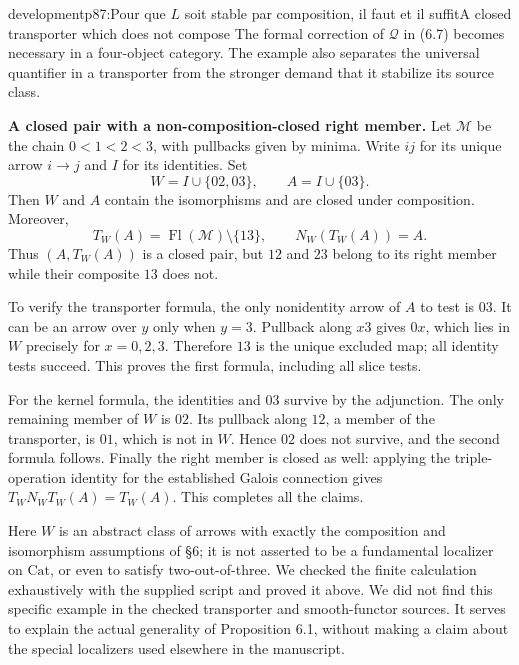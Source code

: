 \begin{dcomment}{development}{p87:Pour que $L$ soit stable par composition, il faut et il suffit}{A closed transporter which does not compose}
The formal correction of $\mathcal Q$ in (6.7) becomes necessary in a four-object category. The example also separates the universal quantifier in a transporter from the stronger demand that it stabilize its source class.

\textbf{A closed pair with a non-composition-closed right member.}\ours{}
Let $\mathcal M$ be the chain $0<1<2<3$, with pullbacks given by minima. Write $ij$ for its unique arrow $i\to j$ and $I$ for its identities. Set
\[
 W=I\cup\{02,03\},\qquad A=I\cup\{03\}.
\]
Then $W$ and $A$ contain the isomorphisms and are closed under composition. Moreover,
\[
 T_W(A)=\operatorname{Fl}(\mathcal M)\setminus\{13\},
 \qquad N_W(T_W(A))=A.
\]
Thus $(A,T_W(A))$ is a closed pair, but $12$ and $23$ belong to its right member while their composite $13$ does not.

To verify the transporter formula, the only nonidentity arrow of $A$ to test is $03$. It can be an arrow over $y$ only when $y=3$. Pullback along $x3$ gives $0x$, which lies in $W$ precisely for $x=0,2,3$. Therefore $13$ is the unique excluded map; all identity tests succeed. This proves the first formula, including all slice tests.

For the kernel formula, the identities and $03$ survive by the adjunction. The only remaining member of $W$ is $02$. Its pullback along $12$, a member of the transporter, is $01$, which is not in $W$. Hence $02$ does not survive, and the second formula follows. Finally the right member is closed as well: applying the triple-operation identity for the established Galois connection gives $T_WN_WT_W(A)=T_W(A)$. This completes all the claims.

Here $W$ is an abstract class of arrows with exactly the composition and isomorphism assumptions of \S6; it is not asserted to be a fundamental localizer on $\mathrm{Cat}$, or even to satisfy two-out-of-three. We checked the finite calculation exhaustively with the supplied script and proved it above. We did not find this specific example in the checked transporter and smooth-functor sources. It serves to explain the actual generality of Proposition 6.1, without making a claim about the special localizers used elsewhere in the manuscript.
\end{dcomment}


